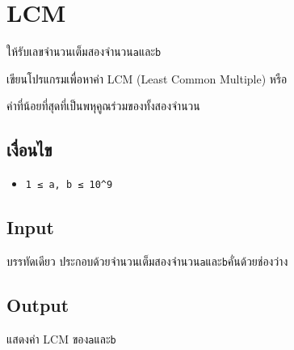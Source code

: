 \documentclass{article}
\begin{document}
\section*{LCM}

ให้รับเลขจำนวนเต็มสองจำนวน\texttt{a}และ\texttt{b}



เขียนโปรแกรมเพื่อหาค่า LCM (Least Common Multiple) หรือ

ค่าที่น้อยที่สุดที่เป็นพหุคูณร่วมของทั้งสองจำนวน



\subsection{เงื่อนไข}\label{uxe40uxe07uxe2duxe19uxe44uxe02}



\begin{itemize}

\item

  \texttt{1\ ≤\ a,\ b\ ≤\ 10\^{}9}

\end{itemize}



\subsection*{Input}
บรรทัดเดียว ประกอบด้วยจำนวนเต็มสองจำนวน\texttt{a}และ\texttt{b}คั่นด้วยช่องว่าง\\



\subsection*{Output}
แสดงค่า LCM ของ\texttt{a}และ\texttt{b}\\
\end{document}
